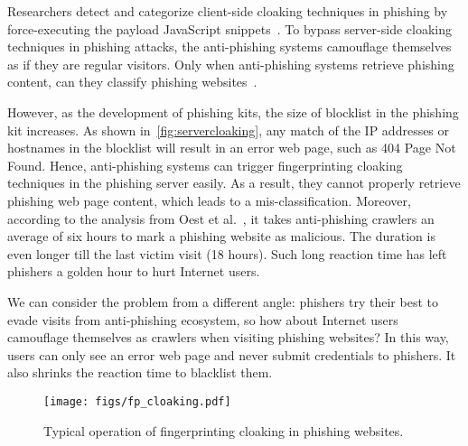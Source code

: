 Researchers detect and categorize client-side cloaking techniques in phishing by force-executing the payload JavaScript snippets~\cite{zhang2021crawlphish}.
To bypass server-side cloaking techniques in phishing attacks, the anti-phishing systems camouflage themselves as if they are regular visitors.
Only when anti-phishing systems retrieve phishing content, can they classify phishing websites~\cite{xiang2011cantina+,whittaker2010large,smartscreen}.

However, as the development of phishing kits, the size of blocklist in the phishing kit increases.
As shown in~\autoref{fig:servercloaking}, any match of the IP addresses or hostnames in the blocklist will result in an error web page, such as 404 Page Not Found.
Hence, anti-phishing systems can trigger fingerprinting cloaking techniques in the phishing server easily.
As a result, they cannot properly retrieve phishing web page content, which leads to a mis-classification.
Moreover, according to the analysis from Oest et al.~\cite{oest2020sunrise}, it takes anti-phishing crawlers an average of six hours to mark a phishing website as malicious.
The duration is even longer till the last victim visit (18 hours).
Such long reaction time has left phishers a golden hour to hurt Internet users.

We can consider the problem from a different angle: phishers try their best to evade visits from anti-phishing ecosystem, so how about Internet users camouflage themselves as crawlers when visiting phishing websites?
In this way, users can only see an error web page and never submit credentials to phishers.
It also shrinks the reaction time to blacklist them.




\begin{figure}
\centering
\texttt{[image: figs/fp\_cloaking.pdf]}
\caption{Typical operation of fingerprinting cloaking in phishing websites.}
\label{fig:fp_cloaking}
\end{figure}